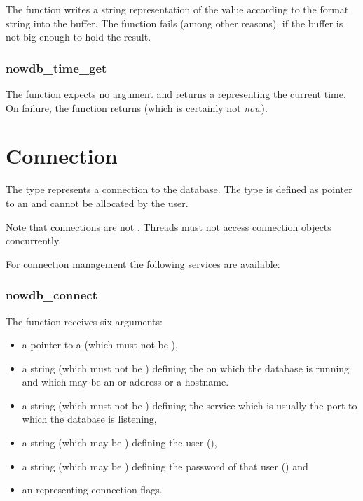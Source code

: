 The function writes a string representation
of the  value
according to the format string
into the  buffer.
The function fails (among other reasons),
if the buffer is not big enough to hold the result.

\subsubsection{nowdb\_time\_get}
The function expects no argument and returns a 
representing the current time. On failure,
the function returns 
(which is certainly not \emph{now}).

\section{Connection}
The type  represents a
 connection to the database.
The type is defined as pointer to an
 and cannot be
allocated by the user.

Note that connections are not .
Threads must not access connection objects
concurrently.

For connection management the following services
are available:

\subsubsection{nowdb\_connect}
The function receives six arguments:
\begin{itemize}
\item a pointer to a 
(which must not be ),
\item a string
(which must not be )
defining the 
on which the database is running and which
may be an   or  address or
a hostname.
\item a string
(which must not be )
defining the service which
is usually the port to which the database is listening,
\item a string
(which may be )
defining the user (),
\item a string
(which may be )
defining the password of that user () and
\item an  representing connection flags.
\end{itemize}

